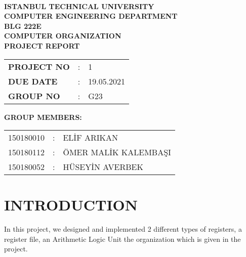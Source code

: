\documentclass[pdftex,12pt,a4paper]{article}
\begin{document}
\begin{titlepage}
\begin{center}
\textbf{}\\
\textbf{\Large{ISTANBUL TECHNICAL UNIVERSITY}}\\
\vspace{0.5cm}
\textbf{\Large{COMPUTER ENGINEERING DEPARTMENT}}\\
\vspace{2cm}
\textbf{\Large{BLG 222E\\ COMPUTER ORGANIZATION\\ PROJECT REPORT}}\\
\vspace{2.8cm}
\begin{table}[ht]
\centering
\Large{
\begin{tabular}{lcl}
\textbf{PROJECT NO}  & : & 1 \\
\textbf{DUE DATE}  & : & 19.05.2021 \\
\textbf{GROUP NO}  & : & G23 \\
\end{tabular}}
\end{table}
\vspace{1cm}
\textbf{\Large{GROUP MEMBERS:}}\\
\begin{table}[ht]
\centering
\Large{
\begin{tabular}{rcl}
150180010  & : & ELİF ARIKAN \\
150180112  & : & ÖMER MALİK KALEMBAŞI \\
150180052  & : & HÜSEYİN AVERBEK \\
\end{tabular}}
\end{table}
\vspace{2.8cm}

\end{center}

\end{titlepage}
%

\setcounter{page}{1}

\section{INTRODUCTION }

In this project, we designed and implemented  2 different types of registers, a register file, an Arithmetic Logic Unit the organization which is given in the project.
\end{document}

